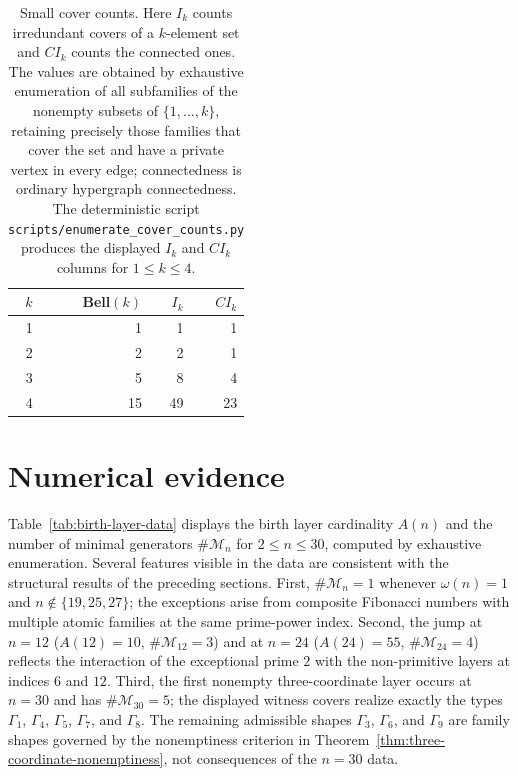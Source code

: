 \documentclass[11pt,letterpaper]{article}
\numberwithin{equation}{section}
\theoremstyle{plain}
\theoremstyle{definition}
\theoremstyle{remark}
\begin{document}
\begin{table}[ht]
\centering
\small
\caption{Small cover counts.  Here \(I_k\) counts irredundant covers of a
\(k\)-element set and \(CI_k\) counts the connected ones.  The values are
obtained by exhaustive enumeration of all subfamilies of the nonempty subsets
of \(\{1,\ldots,k\}\), retaining precisely those families that cover the set
and have a private vertex in every edge; connectedness is ordinary hypergraph
connectedness.  The deterministic script
\texttt{scripts/enumerate\_cover\_counts.py} produces the displayed
\(I_k\) and \(CI_k\) columns for \(1\le k\le4\).}
\label{tab:cover-counts}
\begin{tabular}{rrrr}
\toprule
\(k\) & Bell\((k)\) & \(I_k\) & \(CI_k\)\\
\midrule
1 & 1 & 1 & 1\\
2 & 2 & 2 & 1\\
3 & 5 & 8 & 4\\
4 & 15 & 49 & 23\\
\bottomrule
\end{tabular}
\end{table}
\section{Numerical evidence}\label{sec:numerical}

Table~\ref{tab:birth-layer-data} displays the birth layer cardinality $A(n)$
and the number of minimal generators $\#\mathcal M_n$ for $2\le n\le 30$,
computed by exhaustive enumeration. Several features visible in the data are
consistent with the structural results of the preceding sections.
First, $\#\mathcal M_n=1$ whenever $\omega(n)=1$ and
$n\notin\{19,25,27\}$; the exceptions arise from composite Fibonacci numbers
with multiple atomic families at the same prime-power index.
Second, the jump at $n=12$ ($A(12)=10$, $\#\mathcal M_{12}=3$) and at $n=24$
($A(24)=55$, $\#\mathcal M_{24}=4$) reflects the interaction of the
exceptional prime $2$ with the non-primitive layers at indices $6$ and $12$.
Third, the first nonempty three-coordinate layer occurs at $n=30$ and has
$\#\mathcal M_{30}=5$; the displayed witness covers realize exactly the
types $\Gamma_1$, $\Gamma_4$, $\Gamma_5$, $\Gamma_7$, and $\Gamma_8$.
The remaining admissible shapes $\Gamma_3$, $\Gamma_6$, and $\Gamma_9$ are
family shapes governed by the nonemptiness criterion in
Theorem~\ref{thm:three-coordinate-nonemptiness}, not consequences of the
$n=30$ data.
\end{document}
